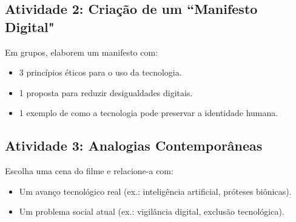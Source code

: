 \documentclass[12pt]{article}
\begin{document}
\begin{multicols}{2}
\subsection*{Atividade 2: Criação de um ``Manifesto Digital"}
Em grupos, elaborem um manifesto com:
\begin{itemize}
    \item 3 princípios éticos para o uso da tecnologia.
    \item 1 proposta para reduzir desigualdades digitais.
    \item 1 exemplo de como a tecnologia pode preservar a identidade humana.
\end{itemize}

\subsection*{Atividade 3: Analogias Contemporâneas}
Escolha uma cena do filme e relacione-a com:
\begin{itemize}
    \item Um avanço tecnológico real (ex.: inteligência artificial, próteses biônicas).
    \item Um problema social atual (ex.: vigilância digital, exclusão tecnológica).
\end{itemize}

\end{multicols}
\end{document}
